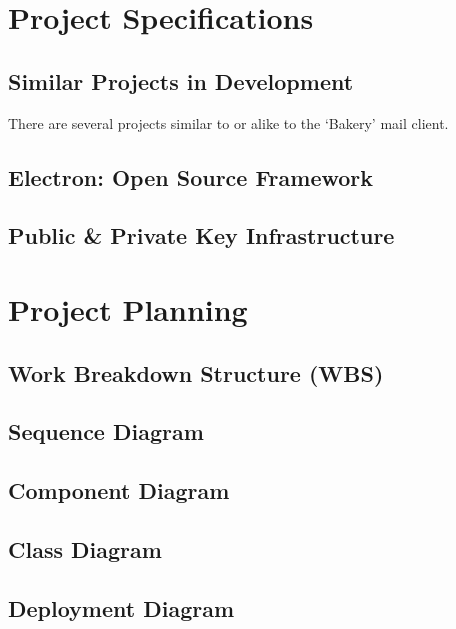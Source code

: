 \documentclass[12pt]{article}
\begin{document}
\section{Project Specifications}
	\subsection{Similar Projects in Development}
		There are several projects similar to or alike to the `Bakery' mail client.
	\subsection{Electron: Open Source Framework}
		\lipsum[1]
	\subsection{Public \& Private Key Infrastructure}
		\lipsum[1]
\pagebreak
\section{Project Planning}
	\lipsum[1]
	\pagebreak
	\subsection{Work Breakdown Structure (WBS)}
	\lipsum[1]
	\pagebreak
	\subsection{Sequence Diagram}
	\lipsum[1]
	\pagebreak
	\subsection{Component Diagram}
	\lipsum[1]
	\pagebreak
	\subsection{Class Diagram}
	\lipsum[1]
	\pagebreak
	\subsection{Deployment Diagram}
	\lipsum[1]
\pagebreak


\end{document}
